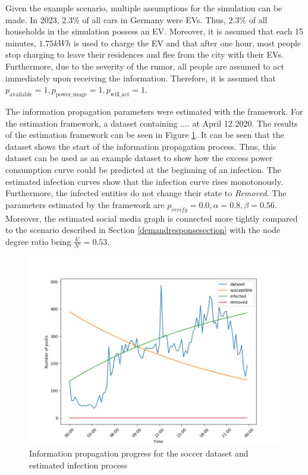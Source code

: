 Given the example scenario, multiple assumptions for the simulation can
be made. In 2023, $2.3\%$ of all cars in Germany were 
EVs. Thus, $2.3\%$ of all households in the simulation
possess an EV. Moreover, it is assumed that 
each 15 minutes, $1.75kWh$ is used to charge the EV 
and that after one hour, most people stop charging
to leave their residences and flee from the city with their EVs.
Furthermore, due to the severity of the rumor,
all people are assumed to act immediately upon 
receiving the information. Therefore, it is assumed 
that $p_{\mathrm{available}}=1, 
p_{\mathrm{power\_usage}}=1, p_{\mathrm{will\_act}}=1$.

The information propagation parameters were estimated with 
the framework. For the estimation framework, a 
dataset containing .... at April 12 2020.
The results of the estimation framework can be seen in 
Figure \ref{geoloctweet}. It can be seen that the dataset 
shows the start of the information propagation process.
Thus, this dataset can be used as an example dataset 
to show how the excess power consumption curve 
could be predicted at the beginning of an infection.
The estimated infection curves show that the infection
curve rises monotonously. Furthermore, the infected 
entities do not change their state to \textit{Removed}.
The parameters estimated by the framework are 
$p_{verify}= 0.0, \alpha = 0.8, \beta = 0.56$.
Moreover, the estimated social media graph is 
connected more tightly compared to the 
scenario described in Section \ref{demandresponsesection} 
with the node degree ratio being 
$\frac{k'}{N'}=0.53$. 

\begin{figure}[!ht]
    \center
    \includegraphics[scale=.6]{figs/eval/scenario3/informationpropagation.png}
    \caption{Information propagation progress for the soccer dataset 
    and estimated infection process}
    \label{geoloctweet}
\end{figure}

